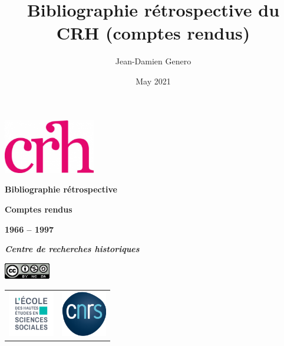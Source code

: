 \documentclass{article}
\title{Bibliographie rétrospective du CRH (comptes rendus)}
\author{Jean-Damien Genero}
\date{May 2021}
\newcommand\blankpage{%
    \null
    \thispagestyle{empty}%
    \addtocounter{page}{-1}%
    \newpage}
\begin{document}
	
\renewcommand{\contentsname}{Sommaire}


\begin{titlepage}
	\begin{center}
		
		\vspace*{1,50cm}
		
		\includegraphics[width=4cm]{../../../img/logo_crh_magenta.png}
		\bigskip
		\bigskip
		\bigskip
		\bigskip
		
		\begin{Huge}
			\textbf{Bibliographie rétrospective}
			
			\bigskip
			
			\bigskip
			
			\textbf{Comptes rendus}
		\end{Huge}
		
		\begin{LARGE}
			\bigskip
			
			\bigskip
			
			\textbf{1966 -- 1997}
			
			\bigskip
			
			\textbf{\emph{Centre de recherches historiques} }\\
		\end{LARGE}
		
		\bigskip
		
		\vspace*{2.25cm}
		
		\includegraphics[width=2cm]{../../../img/licenseccby-nc-sa4.0.png}
		
		\vspace*{3,5cm}
		
		\begin{tabular}{cc}
			\includegraphics[width=2cm]{../../../img/Logo_EHESS_2021_RVB.png} & \includegraphics[width=2cm]{../../../img/cnrslogo.png} \\
		\end{tabular}
		
	\end{center}
	\afterpage{\blankpage}
\end{titlepage}
\end{document}

